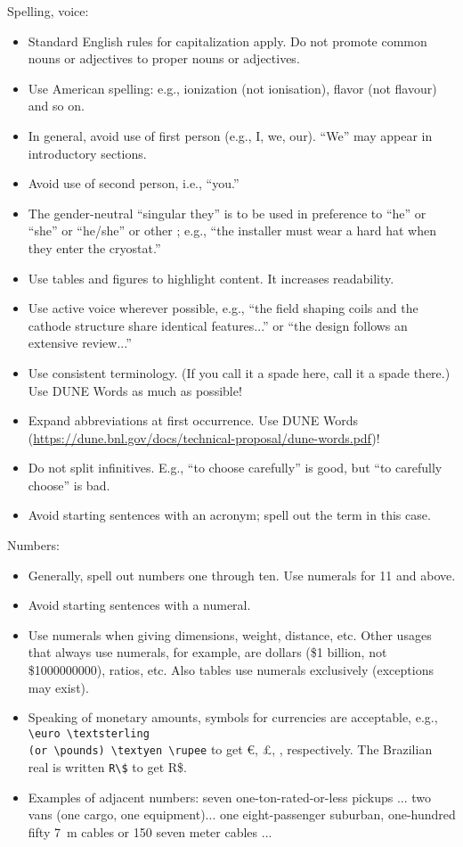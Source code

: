 Spelling, voice:
\begin{itemize}
\item Standard English rules for capitalization apply. Do not promote common nouns or adjectives to proper nouns or adjectives.
\item Use American spelling: e.g., ionization (not ionisation), flavor (not flavour) and so on.
\item In general, avoid use of first person (e.g., I, we, our).  ``We'' may appear in introductory sections.
\item Avoid use of second person, i.e., ``you.''
\item The gender-neutral ``singular they'' is to be used in preference to ``he'' or ``she'' or ``he/she'' or other ; e.g., ``the installer must wear a hard hat when they enter the cryostat.''
\item Use tables and figures to highlight content. It increases readability.
\item Use active voice wherever possible, e.g., ``the field shaping coils and the cathode structure share identical features...'' or ``the design follows  an extensive review...''
\item Use consistent terminology. (If you call it a spade here, call it a spade there.) Use DUNE Words as much as possible!
\item Expand abbreviations at first occurrence. Use DUNE Words (\url{https://dune.bnl.gov/docs/technical-proposal/dune-words.pdf})!
\item Do not split infinitives. E.g., ``to choose carefully'' is good, but ``to carefully choose'' is bad.
\item Avoid starting sentences with an acronym; spell out the term in this case.
\end{itemize}

Numbers:
\begin{itemize}
\item Generally, spell out numbers one through ten. Use numerals for \num{11} and above.
\item Avoid starting sentences with a numeral.
\item Use numerals when giving dimensions, weight, distance, etc. Other usages that always use numerals, for example, are dollars (\$1 billion, not \$\num{1000000000}), ratios, etc. Also tables use numerals exclusively (exceptions may exist).
\item Speaking of monetary amounts, symbols for currencies are acceptable, e.g., \verb|\euro \textsterling| \\
 \verb|(or \pounds) \textyen \rupee| to get \euro, \pounds, \textyen, \rupee{} respectively. The Brazilian real is written \verb|R\$| to get R\$.

\item Examples of adjacent numbers: seven one-ton-rated-or-less pickups ... two vans (one cargo, one equipment)... one eight-passenger suburban, one-hundred fifty \SI{7}{\meter} cables or 150 seven meter cables ...
\end{itemize}

